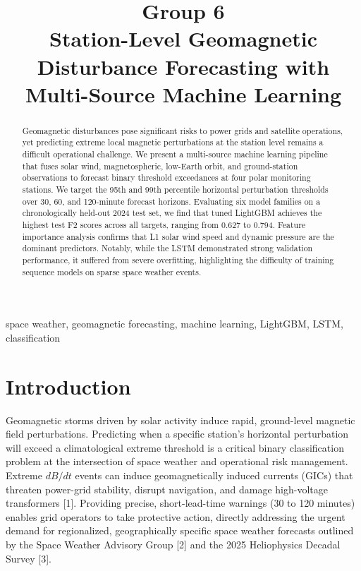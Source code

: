 \documentclass[conference]{IEEEtran}
\begin{document}
\title{Group 6\\
Station-Level Geomagnetic Disturbance Forecasting with Multi-Source Machine Learning}

\author{
}

\maketitle

\begin{abstract}
Geomagnetic disturbances pose significant risks to power grids and satellite operations, yet predicting extreme local magnetic perturbations at the station level remains a difficult operational challenge. We present a multi-source machine learning pipeline that fuses solar wind, magnetospheric, low-Earth orbit, and ground-station observations to forecast binary threshold exceedances at four polar monitoring stations. We target the 95th and 99th percentile horizontal perturbation thresholds over 30, 60, and 120-minute forecast horizons. Evaluating six model families on a chronologically held-out 2024 test set, we find that tuned LightGBM achieves the highest test F2 scores across all targets, ranging from 0.627 to 0.794. Feature importance analysis confirms that L1 solar wind speed and dynamic pressure are the dominant predictors. Notably, while the LSTM demonstrated strong validation performance, it suffered from severe overfitting, highlighting the difficulty of training sequence models on sparse space weather events.
\end{abstract}

\begin{IEEEkeywords}
space weather, geomagnetic forecasting, machine learning, LightGBM, LSTM, classification
\end{IEEEkeywords}

\section{Introduction}
Geomagnetic storms driven by solar activity induce rapid, ground-level magnetic field perturbations. Predicting when a specific station's horizontal perturbation will exceed a climatological extreme threshold is a critical binary classification problem at the intersection of space weather and operational risk management. Extreme $dB/dt$ events can induce geomagnetically induced currents (GICs) that threaten power-grid stability, disrupt navigation, and damage high-voltage transformers [1]. Providing precise, short-lead-time warnings (30 to 120 minutes) enables grid operators to take protective action, directly addressing the urgent demand for regionalized, geographically specific space weather forecasts outlined by the Space Weather Advisory Group [2] and the 2025 Heliophysics Decadal Survey [3].
\end{document}
